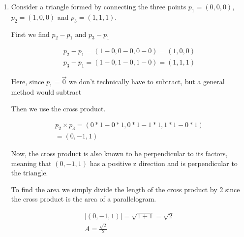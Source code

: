 \documentclass{article}
\begin{document}
\begin{enumerate}
\begin{enumerate}
                    \begin{mdframed}
                        \begin{gather}
                            2 \cdot 6 +
                            3 \cdot 4 +
                            4 \cdot 3\\
                            = 12 + 12 + 12 = 36
                        \end{gather}
                    \end{mdframed}
            \end{enumerate}
            \break
        \item Consider a triangle formed by connecting the three points $p_1 = (0, 0, 0)$, $p_2 = (1, 0, 0)$
            and $p_3 = (1, 1, 1)$.
            \begin{mdframed}
                First we find $p_2 - p_1$ and $p_3 - p_1$

                \begin{gather}
                    p_2 - p_1 = (1 - 0, 0 - 0, 0 - 0) = (1, 0, 0)\\
                    p_3 - p_1 = (1 - 0, 1 - 0, 1 - 0) = (1, 1, 1)
                \end{gather}

                Here, since $p_1 = \vec{0}$ we don't technically have to
                subtract, but a general method would subtract

                Then we use the cross product.

                \begin{gather}
                    p_2 \times p_3 = (0 * 1 - 0 * 1, 0 * 1 - 1 * 1, 1 * 1 - 0 * 1)\\
                    = (0, -1, 1)
                \end{gather}

                Now, the cross product is also known to be perpendicular
                to its factors, meaning that $(0, -1, 1)$ has a positive
                z direction and is perpendicular to the triangle.

                To find the area we simply divide the length of the cross product
                by 2 since the cross product is the area of a parallelogram.

                \begin{gather}
                    |(0, -1, 1)| = \sqrt{1 + 1} = \sqrt{2}\\
                    A = \frac{\sqrt{2}}{2}
                \end{gather}
            \end{mdframed}


\end{enumerate}
\end{document}
